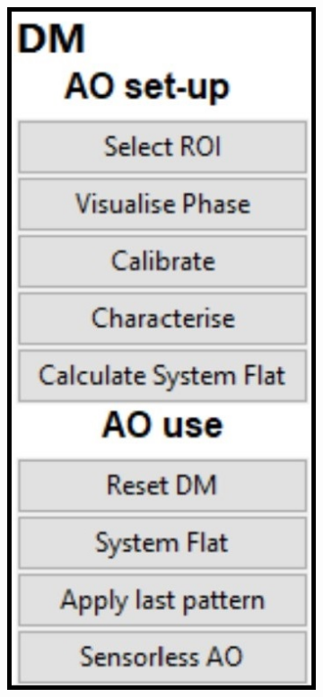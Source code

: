 \begin{figure}
	\centering
	\begin{subfigure}{0.25\textwidth}
		\centering
		\includegraphics[width=\linewidth]{images/DM_methods_cockpit.jpg}

\end{subfigure}
\end{figure}
